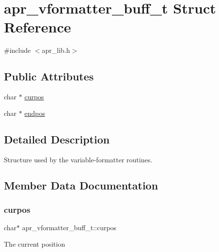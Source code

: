 \hypertarget{structapr__vformatter__buff__t}{}\section{apr\+\_\+vformatter\+\_\+buff\+\_\+t Struct Reference}
\label{structapr__vformatter__buff__t}


{\ttfamily \#include $<$apr\+\_\+lib.\+h$>$}

\subsection*{Public Attributes}
\begin{DoxyCompactItemize}
\item 
char $\ast$ \mbox{\hyperlink{structapr__vformatter__buff__t_aad69bb2ce382b39f55df6cc59039aee9}{curpos}}
\item 
char $\ast$ \mbox{\hyperlink{structapr__vformatter__buff__t_ab4884e759f4285c72df93e0d63022675}{endpos}}
\end{DoxyCompactItemize}


\subsection{Detailed Description}
Structure used by the variable-\/formatter routines. 

\subsection{Member Data Documentation}
\mbox{\label{structapr__vformatter__buff__t_aad69bb2ce382b39f55df6cc59039aee9}} 
\subsubsection{\texorpdfstring{curpos}{curpos}}
{\footnotesize\ttfamily char$\ast$ apr\+\_\+vformatter\+\_\+buff\+\_\+t\+::curpos}

The current position \mbox{\label{structapr__vformatter__buff__t_ab4884e759f4285c72df93e0d63022675}} 
